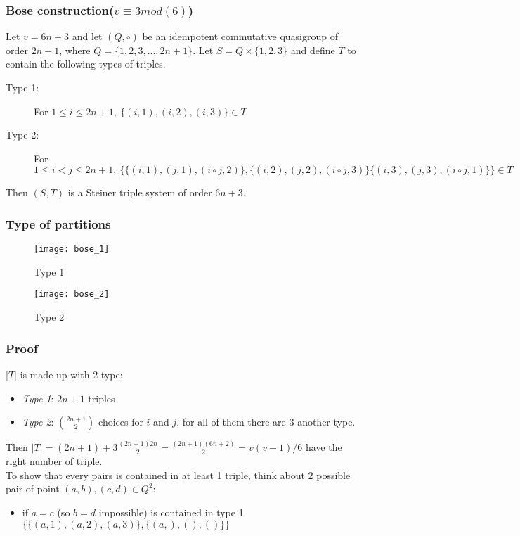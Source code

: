 \begin{frame}
\frametitle{Bose construction($v \equiv 3 mod(6)$)} 
Let $v = 6n +3$ and let $(Q,\circ)$ be an idempotent commutative quasigroup of order $2n+1$, where $Q = \{1,2,3,...,2n+1\}$. Let $S= Q \times \{1,2,3\}$ and define $T$ to contain the following types of triples.
\begin{description}
	\item[Type 1:] For $1 \le i \le 2n +1, \ \{(i,1),(i,2),(i,3)\} \in T$ 
	\item[Type 2:] For $1 \le i < j \le 2n +1, \ \{ \{ (i,1),(j,1),(i \circ j,2)\},\{ (i,2),(j,2),(i \circ j,3)\}\{ (i,3),(j,3),(i \circ j,1)\}\} \in T$
\end{description}

Then $(S,T)$ is a Steiner triple system of order $6n + 3$.

\end{frame}

\begin{frame}
\frametitle{Type of partitions}
\begin{figure}
	\texttt{[image: bose\_1]}
	\caption{Type 1}
\end{figure}
\begin{figure}
	\texttt{[image: bose\_2]}
	\caption{Type 2}
\end{figure}
\end{frame}


\begin{comment}
If we are considering a set of v(v-1)/6 triples of 
elements of a v-set and know that each pair elements is 
contained in at least one triple, then each pair must be 
contained in exactly one triple and we have an STS(v). 
Therefore we need only count the number of triples and verify 
that each pair of elements is contained in a triple in order to 
show that a system is an STS.
\end{comment}
\begin{frame}
\frametitle{Proof}
$|T|$ is made up with 2 type:
\begin{itemize}
	\item \textit{Type 1}: $2n+1$ triples
	\item \textit{Type 2}: $\binom{2n + 1}{2}$ choices for $i$ and $j$, for all of them there are 3 another type.
\end{itemize} 
Then $|T| = (2n+1) + 3\frac{(2n+1)2n}{2} = \frac{(2n+1)(6n+2)}{2} = v(v-1)/6$ have the right number of triple.\\%

To show that every pairs is contained in at least 1 triple, think about 2 possible pair of point $(a,b),(c,d) \in Q^2$:%
\begin{itemize}
	\item if $a=c$ (so $b=d$ impossible) is contained in type 1 $\{\{(a,1),(a,2),(a,3)\}, \{(a,),(),()\}  \}$
\end{itemize}
\end{frame}